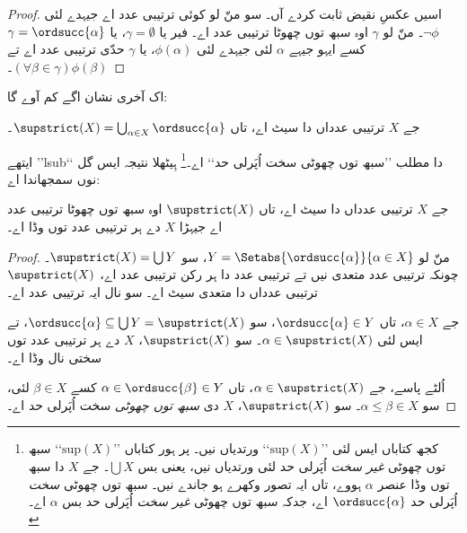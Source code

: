 \documentclass[../../../include/open-logic-section]{subfiles}
\begin{document}
\begin{proof}
اسیں عکسِ نقیض ثابت کردے آں۔ سو منّ لو کوئی ترتیبی عدد اے جیہدے لئی
$\lnot\phi$۔ منّ لو $\gamma$ اوہ سبھ توں چھوٹا ترتیبی عدد اے۔
فیر یا $\gamma = \emptyset$، یا $\gamma = \ordsucc{\alpha}$ کسے ایہو
جیہے $\alpha$ لئی جیہدے لئی $\phi(\alpha)$، یا $\gamma$ حدّی ترتیبی عدد
اے تے $(\forall \beta \in \gamma)\phi(\beta)$۔
\end{proof}
\noindent
اک آخری نشان اگے کم آوے گا:

\begin{defn}
جے $X$ ترتیبی عدداں دا سیٹ اے، تاں
$\supstrict(X) = \bigcup_{\alpha \in X} \ordsucc{\alpha}$۔
\end{defn}
\noindent
ایتھے ’’lsub‘‘ دا مطلب ’’سبھ توں چھوٹی سخت اُپَرلی حد‘‘ اے۔\footnote{کجھ
کتاباں ایس لئی ’’$\text{sup}(X)$‘‘ ورتدیاں نیں۔ پر ہور کتاباں
’’$\text{sup}(X)$‘‘ سبھ توں چھوٹی \emph{غیر سخت} اُپَرلی حد لئی
ورتدیاں نیں، یعنی بس $\bigcup X$۔ جے $X$ دا سبھ توں وڈا عنصر $\alpha$
ہووے، تاں ایہ تصور وکھرے ہو جاندے نیں۔ سبھ توں چھوٹی \emph{سخت} اُپَرلی
حد $\ordsucc{\alpha}$ اے، جدکہ سبھ توں چھوٹی \emph{غیر سخت} اُپَرلی حد
بس $\alpha$ اے۔} ہِیٹھلا نتیجہ ایس گل نوں سمجھاندا اے:

\begin{prop}
جے $X$ ترتیبی عدداں دا سیٹ اے، تاں $\supstrict(X)$ اوہ سبھ توں چھوٹا
ترتیبی عدد اے جیہڑا $X$ دے ہر ترتیبی عدد توں وڈا اے۔
\end{prop}

\begin{proof}
منّ لو $Y = \Setabs{\ordsucc{\alpha}}{\alpha \in X}$، سو
$\supstrict(X) = \bigcup Y$۔ چونکہ ترتیبی عدد متعدی نیں تے ترتیبی عدد
دا ہر رکن ترتیبی عدد اے، $\supstrict(X)$ ترتیبی عدداں دا متعدی سیٹ اے۔
سو  نال ایہ ترتیبی عدد اے۔

جے $\alpha \in X$، تاں $\ordsucc{\alpha} \in Y$، سو
$\ordsucc{\alpha} \subseteq \bigcup Y = \supstrict(X)$، تے ایس لئی
$\alpha \in \supstrict(X)$۔ سو $\supstrict(X)$، $X$ دے ہر ترتیبی عدد
توں سختی نال وڈا اے۔

اُلٹے پاسے، جے $\alpha \in \supstrict(X)$، تاں
$\alpha \in \ordsucc{\beta} \in Y$ کسے $\beta \in X$ لئی، سو
$\alpha \leq \beta \in X$۔ سو $\supstrict(X)$، $X$ دی \emph{سبھ توں
چھوٹی} سخت اُپَرلی حد اے۔
\end{proof}
\end{document}
